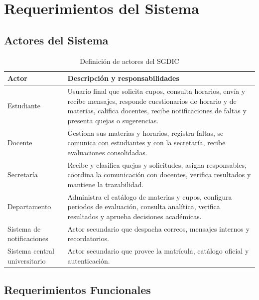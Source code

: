 \chapter{Requerimientos del Sistema}
\label{ch:requerimientos}

\section{Actores del Sistema}

\begin{table}[H]
\centering
\caption{Definición de actores del \ac{SGDIC}}
\label{tab:actores}
\small
\begin{tabularx}{\textwidth}{@{}l X@{}}
\toprule
\rowcolor{azulClaro}
\textbf{Actor} & \textbf{Descripción y responsabilidades} \\
\midrule
Estudiante &
  Usuario final que solicita cupos, consulta horarios, envía y recibe mensajes,
  responde cuestionarios de horario y de materias, califica docentes, recibe
  notificaciones de faltas y presenta quejas o sugerencias. \\
Docente &
  Gestiona sus materias y horarios, registra faltas, se comunica con estudiantes
  y con la secretaría, recibe evaluaciones consolidadas. \\
Secretaría &
  Recibe y clasifica quejas y solicitudes, asigna responsables, coordina la
  comunicación con docentes, verifica resultados y mantiene la trazabilidad. \\
Departamento &
  Administra el catálogo de materias y cupos, configura periodos de evaluación,
  consulta analítica, verifica resultados y aprueba decisiones académicas. \\
Sistema de notificaciones &
  Actor secundario que despacha correos, mensajes internos y recordatorios. \\
Sistema central universitario &
  Actor secundario que provee la matrícula, catálogo oficial y autenticación. \\
\bottomrule
\end{tabularx}
\end{table}

\section{Requerimientos Funcionales}

